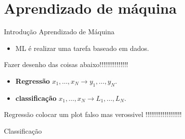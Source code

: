 \documentclass[10pt]{beamer}
\begin{document}
\nocite{DeepLearningbook}
\maketitle

\section{Aprendizado de máquina}

\begin{frame}{Introdução Aprendizado de Máquina}

\begin{itemize}
\item ML é realizar uma tarefa baseado em dados.
\end{itemize}

Fazer desenho das coisas abaixo!!!!!!!!!!!!!!!

\begin{itemize}
\item \textbf{Regressão} $x_1, \dots, x_N \rightarrow y_1, \dots, y_N$.

\item \textbf{classificação} $x_1, \dots, x_N \rightarrow L_1, \dots, L_N$.
\end{itemize}
\end{frame}

\begin{frame}{Regressão}
colocar um plot falso mas verossivel !!!!!!!!!!!!!!!!!!!
\end{frame}


\begin{frame}{Classificação}

\end{frame}
\end{document}

